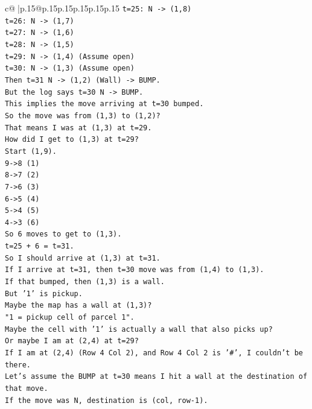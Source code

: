 \documentclass{article}
\begin{document}
{\begin{supertabular}{c@{$\;$}|p{.15\linewidth}@{}p{.15\linewidth}p{.15\linewidth}p{.15\linewidth}p{.15\linewidth}p{.15\linewidth}}
{{{\texttt{t=25: N {-}> (1,8)} \\
\texttt{t=26: N {-}> (1,7)} \\
\texttt{t=27: N {-}> (1,6)} \\
\texttt{t=28: N {-}> (1,5)} \\
\texttt{t=29: N {-}> (1,4) (Assume open)} \\
\texttt{t=30: N {-}> (1,3) (Assume open)} \\
\texttt{Then t=31 N {-}> (1,2) (Wall) {-}> BUMP.} \\
\texttt{But the log says t=30 N {-}> BUMP.} \\
\texttt{This implies the move arriving at t=30 bumped.} \\
\texttt{So the move was from (1,3) to (1,2)?} \\
\texttt{That means I was at (1,3) at t=29.} \\
\texttt{How did I get to (1,3) at t=29?} \\
\texttt{Start (1,9).} \\
\texttt{9{-}>8 (1)} \\
\texttt{8{-}>7 (2)} \\
\texttt{7{-}>6 (3)} \\
\texttt{6{-}>5 (4)} \\
\texttt{5{-}>4 (5)} \\
\texttt{4{-}>3 (6)} \\
\texttt{So 6 moves to get to (1,3).} \\
\texttt{t=25 + 6 = t=31.} \\
\texttt{So I should arrive at (1,3) at t=31.} \\
\texttt{If I arrive at t=31, then t=30 move was from (1,4) to (1,3).} \\
\texttt{If that bumped, then (1,3) is a wall.} \\
\texttt{But '1' is pickup.} \\
\texttt{Maybe the map has a wall at (1,3)?} \\
\texttt{"1 = pickup cell of parcel 1".} \\
\texttt{Maybe the cell with '1' is actually a wall that also picks up?} \\
\texttt{Or maybe I am at (2,4) at t=29?} \\
\texttt{If I am at (2,4) (Row 4 Col 2), and Row 4 Col 2 is '\#', I couldn't be there.} \\
\texttt{Let's assume the BUMP at t=30 means I hit a wall at the destination of that move.} \\
\texttt{If the move was N, destination is (col, row{-}1).} \\
}}}
\end{supertabular}}
\end{document}
